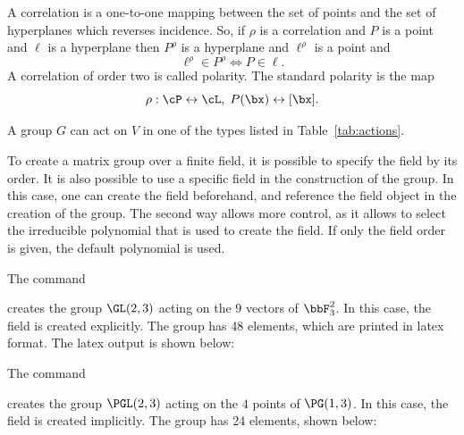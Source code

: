  


\bigskip

A correlation is a one-to-one mapping between the set of 
points and the set of hyperplanes which reverses incidence. 
So, if $\rho$ is a correlation and 
$P$ is a point and $\ell$ is a hyperplane then $P^\rho$ is a hyperplane and $\ell^\rho$ is 
a point and 
$$
\ell^\rho \in P^\rho \iff P \in \ell.
$$
A correlation of order two is called polarity.
The standard polarity is the map 
$$
\rho:  \cP \leftrightarrow \cL, \;P(\bx) \leftrightarrow [\bx].
$$





\bigskip

A group $G$ can act on $V$ in one of the types listed in Table~\ref{tab:actions}.



\bigskip

To create a matrix group over a finite field, 
it is possible to specify the field by its order. 
It is also possible to use a specific field in the construction of the group. 
In this case, one can create the field beforehand, 
and reference the field object in the creation of the group.
The second way allows more control, as it allows to select  
the irreducible polynomial that is used to create the field. 
If only the field order is given, the default polynomial is used. 



\bigskip

The command 


creates the group $\GL(2,3)$ acting on the $9$ vectors of $\bbF_3^2$. 
In this case, the field is created explicitly. The group has 48 elements, which are printed in latex format. 
The latex output is shown below:


\bigskip




The command 


creates the group $\PGL(2,3)$ acting on the $4$ points of $\PG(1,3)$. 
In this case, the field is created implicitly. The group has 24 elements, shown below:





